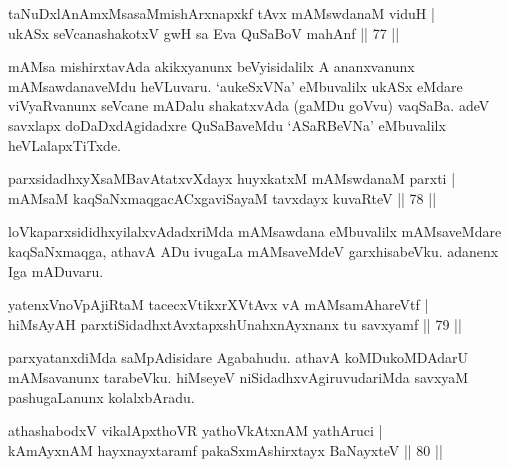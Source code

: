 
\begin{shl}
taNuDxlAnAmxMsasaMmishArxnapxkf tAvx mAMswdanaM viduH | \\
ukASx seVcanashakotxV gwH sa Eva QuSaBoV mahAnf \hfill|| 77 || 
\end{shl}

\begin{artha}
mAMsa mishirxtavAda akikxyanunx beVyisidalilx A ananxvanunx 
mAMsawdanaveMdu heVLuvaru. `aukeSxVNa' eMbuvalilx ukASx eMdare 
viVyaRvanunx seVcane mADalu shakatxvAda (gaMDu goVvu) vaqSaBa. adeV 
savxlapx doDaDxdAgidadxre QuSaBaveMdu `ASaRBeVNa' eMbuvalilx 
heVLalapxTiTxde.
\end{artha}


\begin{shl}
parxsidadhxyXsaMBavAtatxvXdayx huyxkatxM mAMswdanaM parxti | \\
mAMsaM kaqSaNxmaqgacACxgaviSayaM tavxdayx kuvaRteV \hfill|| 78 || 
\end{shl}

\begin{artha}
loVkaparxsididhxyilalxvAdadxriMda mAMsawdana eMbuvalilx mAMsaveMdare 
kaqSaNxmaqga, athavA ADu ivugaLa mAMsaveMdeV garxhisabeVku. adanenx 
Iga mADuvaru.
\end{artha}


\begin{shl}
yatenxVnoVpAjiRtaM tacecxVtikxrXVtAvx vA mAMsamAhareVtf | \\
hiMsAyAH parxtiSidadhxtAvxtapxshUnahxnAyxnanx tu savxyamf \hfill|| 79 || 
\end{shl}

\begin{artha}
parxyatanxdiMda saMpAdisidare Agabahudu. athavA koMDukoMDAdarU 
mAMsavanunx tarabeVku. hiMseyeV niSidadhxvAgiruvudariMda savxyaM 
pashugaLanunx kolalxbAradu.
\end{artha}


\begin{shl}
athashabodxV vikalApxthoVR yathoVkAtxnAM yathAruci | \\
kAmAyxnAM hayxnayxtaramf pakaSxmAshirxtayx BaNayxteV \hfill|| 80 || 
\end{shl}

